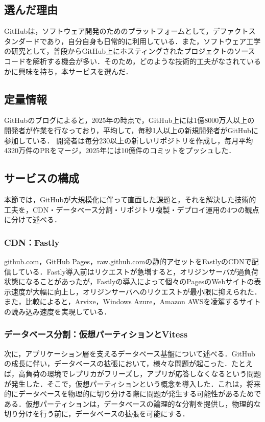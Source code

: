 \documentclass[a4paper,12pt]{article}
\begin{document}
\subsection{選んだ理由}
GitHubは，ソフトウェア開発のためのプラットフォームとして，デファクトスタンダードであり，自分自身も日常的に利用している．また，ソフトウェア工学の研究として，普段からGitHub上にホスティングされたプロジェクトのソースコードを解析する機会が多い．そのため，どのような技術的工夫がなされているかに興味を持ち，本サービスを選んだ．

\subsection{定量情報}
GitHubのブログ\cite{github-octoverse-2025}によると，2025年の時点で，GitHub上には1億8000万人以上の開発者が作業を行なっており，平均して，毎秒1人以上の新規開発者がGitHubに参加している．
開発者は毎分230以上の新しいリポジトリを作成し，毎月平均4320万件のPRをマージ，2025年には10億件のコミットをプッシュした．

\subsection{サービスの構成}

本節では，GitHubが大規模化に伴って直面した課題と，それを解決した技術的工夫を，CDN・データベース分割・リポジトリ複製・デプロイ運用の4つの観点に分けて述べる．

\subsubsection{CDN：Fastly}

github.com，GitHub Pages，raw.github.comの静的アセットをFastlyのCDNで配信している\cite{github-fastly}．Fastly導入前はリクエストが急増すると，オリジンサーバが過負荷状態になることがあったが，Fastlyの導入によって個々のPagesのWebサイトの表示速度が大幅に向上し，オリジンサーバへのリクエストが最小限に抑えられた．また，比較によると，Arvixe，Windows Azure，Amazon AWSを凌駕するサイトの読み込み速度を実現している\cite{github-fastly}．

\subsubsection{データベース分割：仮想パーティションとVitess}

次に，アプリケーション層を支えるデータベース基盤について述べる．GitHubの成長に伴い，データベースの拡張において，様々な問題が起こった\cite{github-mysql8}．たとえば，高負荷の環境でレプリカがフリーズし，アプリが応答しなくなるという問題が発生した．そこで，仮想パーティションという概念を導入した．これは，将来的にデータベースを物理的に切り分ける際に問題が発生する可能性があるためである．仮想パーティションは，データベースの論理的な分割を提供し，物理的な切り分けを行う前に，データベースの拡張を可能にする\cite{github-spokes-stretching}．
\end{document}
